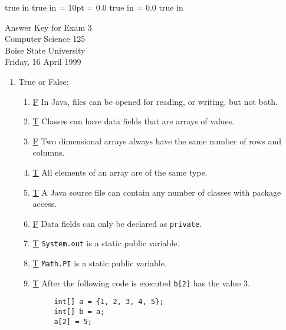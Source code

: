 \pagestyle{empty}
 true in
 true in
\topmargin = 10pt
\oddsidemargin = 0.0 true in
\evensidemargin = 0.0 true in
\newcommand{\ul}{\underline}
\newcommand{\spa}{\hspace{.25in}}


{\Large
\begin{center}
    Answer Key for Exam 3 \\
    Computer Science 125 \\
    Boise State University\\
    Friday, 16 April 1999
\end{center}
}


\begin{enumerate}

        \item True or False:
        \begin{enumerate}
            \item \underline{F} In Java, files can be opened
                for reading, or writing, but not both.

            \item \underline{T} Classes can have data fields that
                are arrays of values.

            \item \underline{F} Two dimensional arrays always 
		have the same number of rows and columns.

            \item \underline{T} All elements of an array are 
		of the same type.

            \item \underline{T} A Java source file can contain
                any number of classes with package access.

            \item \underline{F} Data fields can only be declared
                as {\tt private}.

            \item \underline{T} {\tt System.out} is a static
                public variable.

            \item \underline{T} {\tt Math.PI} is a static public variable.

            \item \underline{T} After the following code is 
		executed {\tt b[2]} has the value 3.
\begin{verbatim}
     int[] a = {1, 2, 3, 4, 5};
     int[] b = a;
     a[2] = 5;
\end{verbatim}



\end{enumerate}
\end{enumerate}
